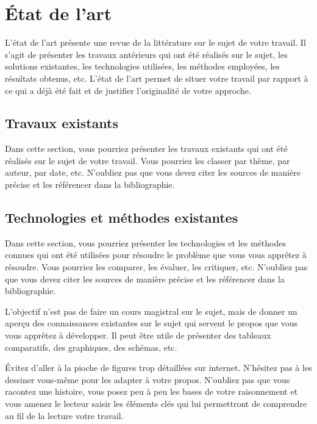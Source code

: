 \chapter{État de l'art}

L'état de l'art présente une revue de la littérature sur le sujet de votre travail. Il s'agit de présenter les travaux antérieurs qui ont été réalisés sur le sujet, les solutions existantes, les technologies utilisées, les méthodes employées, les résultats obtenus, etc. L'état de l'art permet de situer votre travail par rapport à ce qui a déjà été fait et de justifier l'originalité de votre approche.

\section{Travaux existants}

Dans cette section, vous pourriez présenter les travaux existants qui ont été réalisés sur le sujet de votre travail. Vous pourriez les classer par thème, par auteur, par date, etc. N'oubliez pas que vous devez citer les sources de manière précise et les référencer dans la bibliographie.

\section{Technologies et méthodes existantes}

Dans cette section, vous pourriez présenter les technologies et les méthodes connues qui ont été utilisées pour résoudre le problème que vous vous apprêtez à résoudre. Vous pourriez les comparer, les évaluer, les critiquer, etc. N'oubliez pas que vous devez citer les sources de manière précise et les référencer dans la bibliographie.

L'objectif n'est pas de faire un cours magistral sur le sujet, mais de donner un aperçu des connaissances existantes sur le sujet qui servent le propos que vous vous apprêtez à développer. Il peut être utile de présenter des tableaux comparatifs, des graphiques, des schémas, etc.

Évitez d'aller à la pioche de figures trop détaillées sur internet. N'hésitez pas à les dessiner vous-même pour les adapter à votre propos. N'oubliez pas que vous racontez une histoire, vous posez peu à peu les bases de votre raisonnement et vous amenez le lecteur saisir les éléments clés qui lui permettront de comprendre au fil de la lecture votre travail.